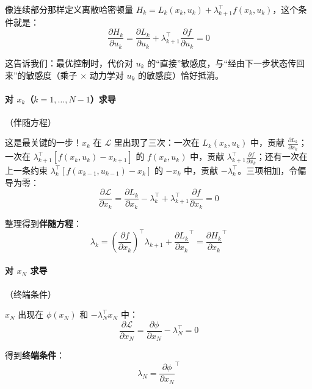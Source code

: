 像连续部分那样定义离散哈密顿量 $H_k = L_k(x_k, u_k) + \lambda_{k+1}^\top f(x_k, u_k)$，这个条件就是：
\begin{equation}
\boxed{\frac{\partial H_k}{\partial u_k} = \frac{\partial L_k}{\partial u_k} + \lambda_{k+1}^\top \frac{\partial f}{\partial u_k} = 0}
\end{equation}

这告诉我们：最优控制时，代价对 $u_k$ 的“直接”敏感度，与“经由下一步状态传回来”的敏感度（乘子 × 动力学对 $u_k$ 的敏感度）恰好抵消。

\paragraph{对 $x_k$（$k = 1, \ldots, N-1$）求导}（伴随方程）

这是最关键的一步！$x_k$ 在 $\mathcal{L}$ 里出现了三次：一次在 $L_k(x_k, u_k)$ 中，贡献 $\frac{\partial L_k}{\partial x_k}$；一次在 $\lambda_{k+1}^\top [f(x_k, u_k) - x_{k+1}]$ 的 $f(x_k, u_k)$ 中，贡献 $\lambda_{k+1}^\top \frac{\partial f}{\partial x_k}$；还有一次在上一条约束 $\lambda_k^\top [f(x_{k-1}, u_{k-1}) - x_k]$ 的 $-x_k$ 中，贡献 $-\lambda_k^\top$。三项相加，令偏导为零：
\[
\frac{\partial \mathcal{L}}{\partial x_k} = \frac{\partial L_k}{\partial x_k} - \lambda_k^\top + \lambda_{k+1}^\top \frac{\partial f}{\partial x_k} = 0
\]

整理得到\textbf{伴随方程}：
\begin{equation}
\boxed{\lambda_k = \left(\frac{\partial f}{\partial x_k}\right)^\top \lambda_{k+1} + \frac{\partial L_k}{\partial x_k}^\top = \frac{\partial H_k}{\partial x_k}^\top}
\end{equation}

\paragraph{对 $x_N$ 求导}（终端条件）

$x_N$ 出现在 $\phi(x_N)$ 和 $-\lambda_N^\top x_N$ 中：
\[
\frac{\partial \mathcal{L}}{\partial x_N} = \frac{\partial \phi}{\partial x_N} - \lambda_N^\top = 0
\]

得到\textbf{终端条件}：
\begin{equation}
\boxed{\lambda_N = \frac{\partial \phi}{\partial x_N}^\top}
\end{equation}

